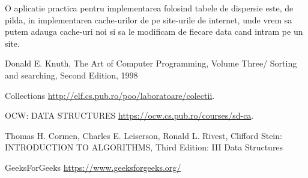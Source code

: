 \documentclass[runningheads]{llncs}
\begin{document}
O aplicatie practica pentru implementarea folosind tabele de dispersie este, de pilda, in implementarea cache-urilor de pe site-urile de internet, unde vrem sa putem adauga cache-uri noi si sa le modificam de fiecare data cand intram pe un site. 


\begin{thebibliography}{8}
Donald E. Knuth, The Art of Computer Programming, Volume Three/ Sorting and searching, Second Edition, 1998

Collections \url{http://elf.cs.pub.ro/poo/laboratoare/colectii}.

OCW: DATA STRUCTURES \url{https://ocw.cs.pub.ro/courses/sd-ca}.

Thomas H. Cormen, Charles E. Leiserson, Ronald L. Rivest, Cliﬀord Stein: INTRODUCTION TO ALGORITHMS, Third Edition: III Data Structures



GeeksForGeeks \url{https://www.geeksforgeeks.org/}
\end{thebibliography}
\end{document}
